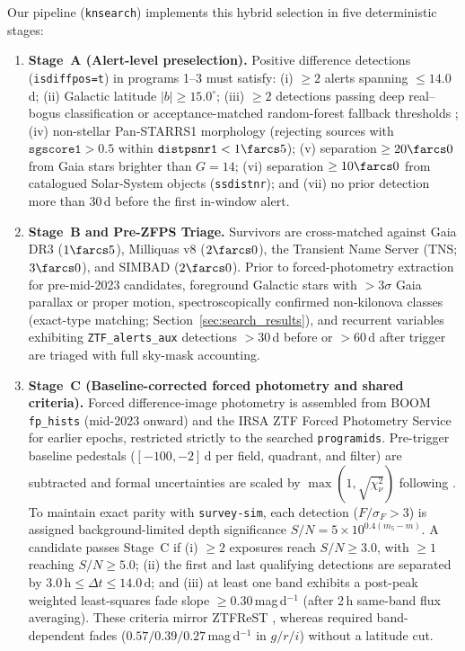 \documentclass[twocolumn]{aastex631}
\begin{document}
Our pipeline (\texttt{knsearch}) implements this hybrid selection in five deterministic stages:
\begin{enumerate}
\item \textbf{Stage~A (Alert-level preselection).} Positive difference detections (\texttt{isdiffpos=t}) in programs 1--3 must satisfy: (i) $\ge 2$ alerts spanning $\le 14.0$\,d; (ii) Galactic latitude $|b| \ge 15.0^\circ$; (iii) $\ge 2$ detections passing deep real--bogus classification \citep[$\texttt{drb} \ge 0.5$;][]{Duev2019} or acceptance-matched random-forest fallback thresholds \citep[$\texttt{rb} \ge 0.474$, $0.293$, and $0.477$ across classifier epochs \texttt{t8\_f5\_c3}, \texttt{t15\_f5\_c3}, and \texttt{t17\_f5\_c3};][]{Mahabal2019}; (iv) non-stellar Pan-STARRS1 morphology (rejecting sources with $\texttt{sgscore1} > 0.5$ within $\texttt{distpsnr1} < 1\farcs5$); (v) separation $\ge 20\farcs0$ from Gaia stars brighter than $G = 14$; (vi) separation $\ge 10\farcs0$ from catalogued Solar-System objects (\texttt{ssdistnr}); and (vii) no prior detection more than 30\,d before the first in-window alert.
\item \textbf{Stage~B and Pre-ZFPS Triage.} Survivors are cross-matched against Gaia DR3 ($1\farcs5$), Milliquas v8 ($2\farcs0$), the Transient Name Server (TNS; $3\farcs0$), and SIMBAD ($2\farcs0$). Prior to forced-photometry extraction for pre-mid-2023 candidates, foreground Galactic stars with $>3\sigma$ Gaia parallax or proper motion, spectroscopically confirmed non-kilonova classes (exact-type matching; Section~\ref{sec:search_results}), and recurrent variables exhibiting \texttt{ZTF\_alerts\_aux} detections $>30$\,d before or $>60$\,d after trigger are triaged with full sky-mask accounting.
\item \textbf{Stage~C (Baseline-corrected forced photometry and shared criteria).} Forced difference-image photometry is assembled from BOOM \texttt{fp\_hists} (mid-2023 onward) and the IRSA ZTF Forced Photometry Service \citep[ZFPS;][]{Masci2023} for earlier epochs, restricted strictly to the searched \texttt{programids}. Pre-trigger baseline pedestals ($[-100, -2]$\,d per field, quadrant, and filter) are subtracted and formal uncertainties are scaled by $\max(1, \sqrt{\chi^2_\nu})$ following \citet{Masci2023}. To maintain exact parity with \texttt{survey-sim}, each detection ($F/\sigma_F > 3$) is assigned background-limited depth significance $S/N = 5\times 10^{0.4(m_5 - m)}$. A candidate passes Stage~C if (i) $\ge 2$ exposures reach $S/N \ge 3.0$, with $\ge 1$ reaching $S/N \ge 5.0$; (ii) the first and last qualifying detections are separated by $3.0\,\mathrm{h} \le \Delta t \le 14.0\,\mathrm{d}$; and (iii) at least one band exhibits a post-peak weighted least-squares fade slope $\ge 0.30$\,mag\,d$^{-1}$ (after 2\,h same-band flux averaging). These criteria mirror ZTFReST \citep{Andreoni2021}, whereas \citet{Andreoni2020} required band-dependent fades ($0.57/0.39/0.27$\,mag\,d$^{-1}$ in $g/r/i$) without a latitude cut.

\end{enumerate}
\end{document}

